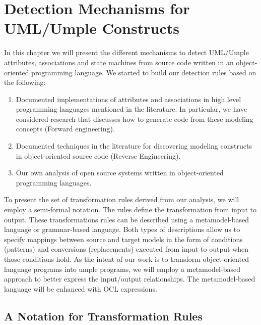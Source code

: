 \lhead{\emph{\leftmark}}  

\chapter{Detection Mechanisms for UML/Umple Constructs}
\label{chap:detections}

In this chapter we will present the different mechanisms to detect UML/Umple attributes, associations and state machines from source code written in an object-oriented programming language. We started to build our detection rules based on the following:

\begin{enumerate}

\item Documented implementations of attributes and associations in high level programming languages mentioned in the literature. In particular, we have considered research that discusses how to generate code from these modeling concepts (Forward engineering).

\item Documented techniques in the literature for discovering  modeling constructs in object-oriented source code (Reverse Engineering).

\item Our own analysis of open source systems written in object-oriented programming languages.

\end{enumerate}

To present the set of transformation rules derived from our analysis, we will employ a semi-formal notation. The rules define the transformation from input to output. These transformations rules can be described using a metamodel-based language or grammar-based language. Both types of descriptions allow us to specify mappings between source and target models in the form of conditions (patterns) and conversions (replacements) executed from input to output when those conditions hold. As the intent of our work is to transform object-oriented  language programs into umple programs, we will employ a metamodel-based approach to better express the input/output relationships. The metamodel-based language will be enhanced with OCL \cite{WarmerOCL2003} expressions. 

\section{A Notation for Transformation Rules}
\label{sec:2ModelTransformation}

